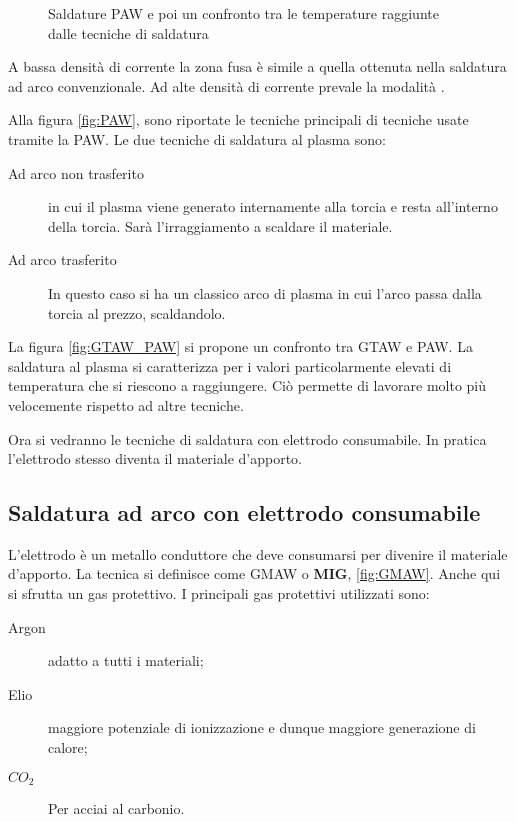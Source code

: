 \begin{figure}
\centering
{}\quad
{}
\caption{Saldature \ac{PAW} e poi un confronto tra le temperature raggiunte dalle tecniche di saldatura}
\label{fig:SaldaturePermanenti}
\end{figure}

A bassa densità di corrente la zona fusa è simile a quella ottenuta nella saldatura ad arco convenzionale.
Ad alte densità di corrente prevale la modalità .

Alla figura \ref{fig:PAW}, sono riportate le tecniche principali di tecniche usate tramite la \ac{PAW}.
Le due tecniche di saldatura al plasma sono:
\begin{description}
\item[Ad arco non trasferito] in cui il plasma viene generato internamente alla torcia e resta all'interno della torcia. Sarà l'irraggiamento a scaldare il materiale.
\item[Ad arco trasferito] In questo caso si ha un classico arco di plasma in cui l'arco passa dalla torcia al prezzo, scaldandolo.
\end{description}

La figura \ref{fig:GTAW_PAW} si propone un confronto tra \ac{GTAW} e \ac{PAW}.
La saldatura al plasma si caratterizza per i valori particolarmente elevati di temperatura che si riescono a raggiungere. Ciò permette di lavorare molto più velocemente rispetto ad altre tecniche.

Ora si vedranno le tecniche di saldatura con elettrodo consumabile.
In pratica l'elettrodo stesso diventa il materiale d'apporto.

\subsection{Saldatura ad arco con elettrodo consumabile}
L'elettrodo è un metallo conduttore che deve consumarsi per divenire il materiale d'apporto.
La tecnica si definisce come \ac{GMAW} o \textbf{MIG}, \ref{fig:GMAW}. 
Anche qui si sfrutta un gas protettivo.
I principali gas protettivi utilizzati sono:
\begin{description}
\item[Argon] adatto a tutti i materiali;
\item[Elio] maggiore potenziale di ionizzazione e dunque maggiore generazione di calore;
\item[$CO_2$] Per acciai al carbonio.
\end{description}

